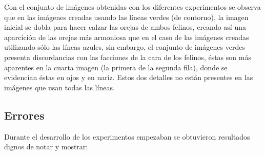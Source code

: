 \documentclass[conference]{IEEEtran}
\begin{document}
	Con el conjunto de imágenes obtenidas con los diferentes experimentos se observa que en las imágenes creadas usando las líneas verdes (de contorno), la imagen inicial se dobla para hacer calzar las orejas de ambos felinos, creando así una aparcición de las orejas más armoniosa que en el caso de las imágenes creadas utilizando sólo las líneas azules, sin embargo, el conjunto de imágenes verdes presenta discordancias con las facciones de la cara de los felinos, éstas son más aparentes en la cuarta imagen (la primera de la segunda fila), donde se evidencian éstas en ojos y en nariz. Estos dos detalles no están presentes en las imágenes que usan todas las líneas.


	\subsection*{Errores}
	
	Durante el desarrollo de los experimentos empezaban se obtuvieron resultados dignos de notar y mostrar:
		
\end{document}
